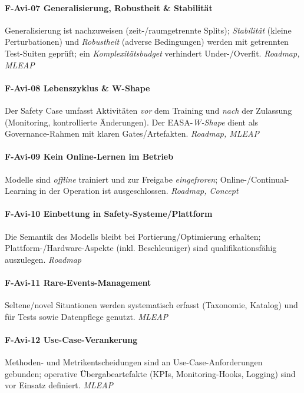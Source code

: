 \paragraph {F-Avi-07 Generalisierung, Robustheit \& Stabilität}
  {Generalisierung ist nachzuweisen (zeit-/raumgetrennte Splits); \emph{Stabilität} (kleine Perturbationen) und \emph{Robustheit} (adverse Bedingungen) werden mit getrennten Test-Suiten geprüft; ein \emph{Komplexitätsbudget} verhindert Under-/Overfit. \textit{Roadmap, MLEAP}}

\paragraph {F-Avi-08 Lebenszyklus \& W-Shape}
  {Der Safety Case umfasst Aktivitäten \emph{vor} dem Training und \emph{nach} der Zulassung (Monitoring, kontrollierte Änderungen). Der EASA-\emph{W-Shape} dient als Governance-Rahmen mit klaren Gates/Artefakten. \textit{Roadmap, MLEAP}}

\paragraph {F-Avi-09 Kein Online-Lernen im Betrieb}
  {Modelle sind \emph{offline} trainiert und zur Freigabe \emph{eingefroren}; Online-/Continual-Learning in der Operation ist ausgeschlossen. \textit{Roadmap, Concept}}

\paragraph {F-Avi-10 Einbettung in Safety-Systeme/Plattform}
  {Die Semantik des Modells bleibt bei Portierung/Optimierung erhalten; Plattform-/Hardware-Aspekte (inkl. Beschleuniger) sind qualifikationsfähig auszulegen. \textit{Roadmap}}

\paragraph {F-Avi-11 Rare-Events-Management}
  {Seltene/novel Situationen werden systematisch erfasst (Taxonomie, Katalog) und für Tests sowie Datenpflege genutzt. \textit{MLEAP}}

\paragraph {F-Avi-12 Use-Case-Verankerung}
  {Methoden- und Metrikentscheidungen sind an Use-Case-Anforderungen gebunden; operative Übergabeartefakte (KPIs, Monitoring-Hooks, Logging) sind vor Einsatz definiert. \textit{MLEAP}}




